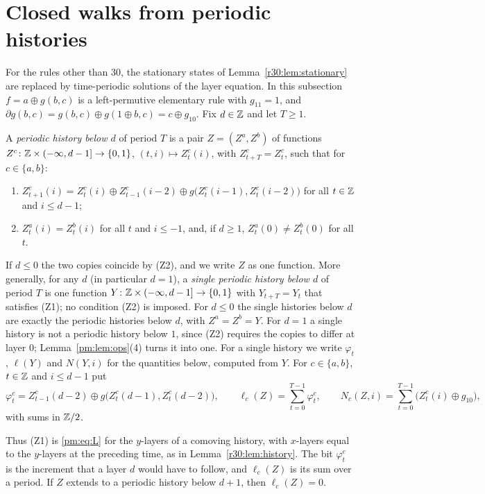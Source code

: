 \section{Closed walks from periodic histories}\label{pm:sec:hist}

For the rules other than $30$, the stationary states of Lemma~\ref{r30:lem:stationary} are replaced by time-periodic solutions of the layer equation. In this subsection $f=a\oplus g(b,c)$ is a left-permutive elementary rule with $g_{11}=1$, and $\partial g(b,c)=g(b,c)\oplus g(1\oplus b,c)=c\oplus g_{10}$. Fix $d\in\mathbb{Z}$ and let $T\ge1$.

\begin{definition}\label{pm:def:history}
A \emph{periodic history below $d$} of period $T$ is a pair $Z=(Z^a,Z^b)$ of functions $Z^c\colon\mathbb{Z}\times(-\infty,d-1]\to\{0,1\}$, $(t,i)\mapsto Z^c_t(i)$, with $Z^c_{t+T}=Z^c_t$, such that for $c\in\{a,b\}$:
\begin{enumerate}
\item[(Z1)] $Z^c_{t+1}(i)=Z^c_t(i)\oplus Z^c_{t-1}(i-2)\oplus g\bigl(Z^c_t(i-1),Z^c_t(i-2)\bigr)$ for all $t\in\mathbb{Z}$ and $i\le d-1$;
\item[(Z2)] $Z^a_t(i)=Z^b_t(i)$ for all $t$ and $i\le-1$, and, if $d\ge1$, $Z^a_t(0)\ne Z^b_t(0)$ for all $t$.
\end{enumerate}
If $d\le0$ the two copies coincide by (Z2), and we write $Z$ as one function. More generally, for any $d$ (in particular $d=1$), a \emph{single periodic history below $d$} of period $T$ is one function $Y\colon\mathbb{Z}\times(-\infty,d-1]\to\{0,1\}$ with $Y_{t+T}=Y_t$ that satisfies (Z1); no condition (Z2) is imposed. For $d\le0$ the single histories below $d$ are exactly the periodic histories below $d$, with $Z^a=Z^b=Y$. For $d=1$ a single history is not a periodic history below $1$, since (Z2) requires the copies to differ at layer $0$; Lemma~\ref{pm:lem:ops}(4) turns it into one. For a single history we write $\varphi_t$, $\ell(Y)$ and $N(Y,i)$ for the quantities below, computed from $Y$. For $c\in\{a,b\}$, $t\in\mathbb{Z}$ and $i\le d-1$ put
\[
\varphi^c_t=Z^c_{t-1}(d-2)\oplus g\bigl(Z^c_t(d-1),Z^c_t(d-2)\bigr),\qquad \ell_c(Z)=\sum_{t=0}^{T-1}\varphi^c_t,\qquad N_c(Z,i)=\sum_{t=0}^{T-1}\bigl(Z^c_t(i)\oplus g_{10}\bigr),
\]
with sums in $\mathbb{Z}/2$.
\end{definition}

Thus (Z1) is \eqref{pm:eq:L} for the $y$-layers of a comoving history, with $x$-layers equal to the $y$-layers at the preceding time, as in Lemma~\ref{r30:lem:history}. The bit $\varphi^c_t$ is the increment that a layer $d$ would have to follow, and $\ell_c(Z)$ is its sum over a period. If $Z$ extends to a periodic history below $d+1$, then $\ell_c(Z)=0$.

